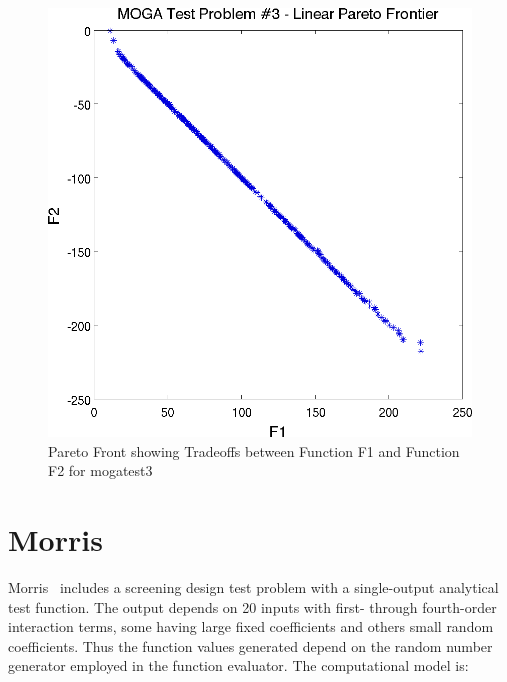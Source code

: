 \begin{figure}
  \centering
  \includegraphics[scale=0.75]{images/dakota_mogatest3_pareto_front}
  \caption{Pareto Front showing Tradeoffs between Function F1 and
    Function F2 for mogatest3}
  \label{additional:moga3front}
\end{figure}

\clearpage
\section{Morris}\label{additional:morris}

Morris~\cite{Mor91} includes a screening design test problem with a
single-output analytical test function. The output depends on 20
inputs with first- through fourth-order interaction terms, some having
large fixed coefficients and others small random coefficients. Thus
the function values generated depend on the random number generator
employed in the function evaluator. The computational model is:

